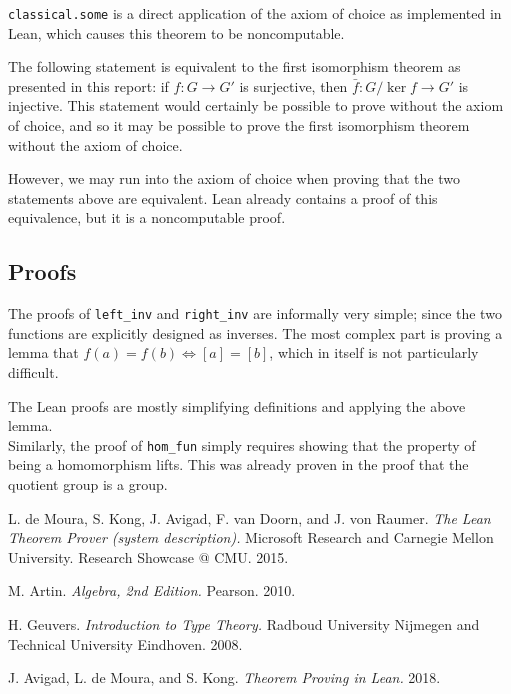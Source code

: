 \documentclass[runningheads,a4paper]{llncs}
\renewcommand{\-}{\setminus}
\begin{document}
\lstinline{classical.some} is a direct application of the axiom of choice as implemented in Lean, which causes this theorem to be noncomputable.

The following statement is equivalent to the first isomorphism theorem as presented in this report: if $f : G \to G'$ is surjective, then $\bar f : G / \ker f \to G'$ is injective. This statement would certainly be possible to prove without the axiom of choice, and so it may be possible to prove the first isomorphism theorem without the axiom of choice.

However, we may run into the axiom of choice when proving that the two statements above are equivalent. Lean already contains a proof of this equivalence, but it is a noncomputable proof.

\subsection{Proofs}

The proofs of \lstinline{left_inv} and \lstinline{right_inv} are informally very simple; since the two functions are explicitly designed as inverses. The most complex part is proving a lemma that $f(a) = f(b) \iff [a] = [b]$, which in itself is not particularly difficult.

The Lean proofs are mostly simplifying definitions and applying the above lemma.\\

Similarly, the proof of \lstinline{hom_fun} simply requires showing that the property of being a homomorphism lifts. This was already proven in the proof that the quotient group is a group.

\begin{thebibliography}{1}

 L. de Moura, S. Kong, J. Avigad, F. van Doorn, and J. von Raumer. {\em The Lean Theorem Prover (system description).} Microsoft Research and Carnegie Mellon University. Research Showcase @ CMU. 2015.

 M. Artin. {\em Algebra, 2nd Edition.} Pearson. 2010.

 H. Geuvers. {\em Introduction to Type Theory.} Radboud University Nijmegen and Technical University Eindhoven. 2008.

 J. Avigad, L. de Moura, and S. Kong. {\em Theorem Proving in Lean.} 2018.

\end{thebibliography}
\end{document}
